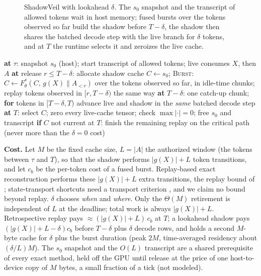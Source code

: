 \documentclass[conference]{IEEEtran}
\begin{document}
\begin{figure}[t]
\centering
\resizebox{0.9\columnwidth}{!}{}
\caption{ShadowVeil with lookahead $\delta$. The $s_0$ snapshot and the transcript of allowed tokens wait in host
memory; fused bursts over the tokens observed so far build the shadow before $T{-}\delta$, the shadow then shares the batched decode step with
the live branch for $\delta$ tokens, and at $T$ the runtime selects it and zeroizes the live cache.}
\label{fig:overview}
\end{figure}

\begin{algorithm}[t]
\caption{ShadowVeil($\delta$): one revocation domain}
\label{alg:shadow}
\begin{algorithmic}[1]
\STATE \textbf{at} $\tau$: snapshot $s_0$ (host); start transcript of allowed tokens; live consumes $X$, then $A$
\STATE \textbf{at} release $r\le T{-}\delta$: allocate shadow cache $C\!\leftarrow\!s_0$; \textsc{Burst}: $C\!\leftarrow\!F^*_\theta(C,\,g(X)\|A_{<r})$ over the tokens observed so far, in idle-time chunks; replay tokens observed in $[r,T{-}\delta)$ the same way
\STATE \textbf{at} $T{-}\delta$: one catch-up chunk; \textbf{for} tokens in $[T{-}\delta,T)$ advance live and shadow in the \emph{same} batched decode step
\STATE \textbf{at} $T$: select $C$; zero every live-cache tensor; check $\max|\cdot|{=}0$; free $s_0$ and transcript
\STATE \textbf{if} $C$ not current at $T$: finish the remaining replay on the critical path (never more than the $\delta{=}0$ cost)
\end{algorithmic}
\end{algorithm}

\textbf{Cost.} Let $M$ be the fixed cache size, $L=|A|$ the authorized window (the tokens between $\tau$ and
$T$), so that the shadow performs $|g(X)|{+}L$ token transitions, and let $c_b$ be the per-token cost of
a fused burst. Replay-based exact reconstruction performs these $|g(X)|{+}L$ extra
transitions, the replay bound of \cite{executionunlearning}; state-transport shortcuts need a transport
criterion \cite{deltaomission}, and we claim no bound beyond replay. $\delta$ chooses \emph{when} and
\emph{where}. Only the $\Theta(M)$ retirement is independent of $L$ at the deadline; total work is always
$|g(X)|{+}L$. Retrospective replay pays $\approx(|g(X)|{+}L)\,c_b$ at $T$; a lookahead shadow pays
$(|g(X)|{+}L{-}\delta)c_b$ before $T{-}\delta$ plus $\delta$ decode rows, and holds a second $M$-byte cache
for $\delta$ plus the burst duration (peak $2M$, time-averaged residency about $(\delta/L)M$). The $s_0$
snapshot and the $O(L)$ transcript are a shared prerequisite of every exact method, held off the GPU until
release at the price of one host-to-device copy of $M$ bytes, a small fraction of a tick (not modeled).
\end{document}
